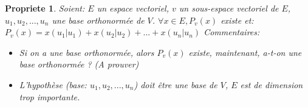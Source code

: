 \documentclass[11pt,a4paper]{article} %
\newtheorem{prop}[defin]{Propriete}
\begin{document}
\begin{prop}
  Soient: $E$ un espace vectoriel, $v$ un sous-espace vectoriel de $E$, $u_1, u_2,..., u_n$ une base orthonormée de $V$.
  $\forall x \in E, P_v(x)$ existe et: $P_v(x) = x(u_1|u_1)+x(u_2|u_2)+...+x(u_n|u_n)$
  Commentaires:
  \begin{itemize}
    \item Si on a une base orthonormée, alors $P_v(x)$ existe, maintenant, a-t-on une base orthonormée ? (A prouver)
    \item L'hypothèse (base: $u_1, u_2,..., u_n$) doit être une base de $V$, $E$ est de dimension trop importante.
  \end{itemize}
  
  
  
\end{prop}
\end{document}
